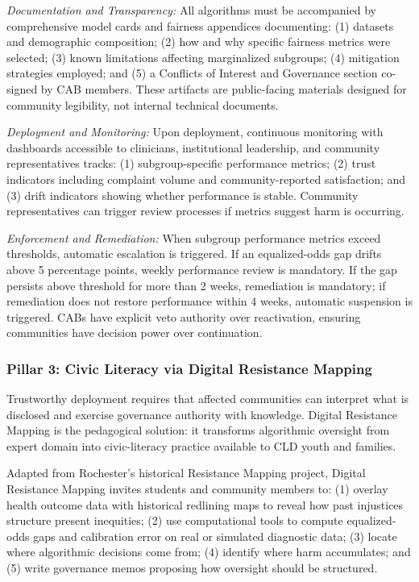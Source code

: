 \documentclass[12pt,a4paper]{article}
\begin{document}
\textit{Documentation and Transparency:} All algorithms must be accompanied by comprehensive model cards and fairness appendices documenting: (1) datasets and demographic composition; (2) how and why specific fairness metrics were selected; (3) known limitations affecting marginalized subgroups; (4) mitigation strategies employed; and (5) a Conflicts of Interest and Governance section co-signed by CAB members.\cite{chen2023} These artifacts are public-facing materials designed for community legibility, not internal technical documents.\cite{lekadir2025}

\textit{Deployment and Monitoring:} Upon deployment, continuous monitoring with dashboards accessible to clinicians, institutional leadership, and community representatives tracks: (1) subgroup-specific performance metrics; (2) trust indicators including complaint volume and community-reported satisfaction; and (3) drift indicators showing whether performance is stable.\cite{sagona2025} Community representatives can trigger review processes if metrics suggest harm is occurring.

\textit{Enforcement and Remediation:} When subgroup performance metrics exceed thresholds, automatic escalation is triggered. If an equalized-odds gap drifts above 5 percentage points, weekly performance review is mandatory. If the gap persists above threshold for more than 2 weeks, remediation is mandatory; if remediation does not restore performance within 4 weeks, automatic suspension is triggered.\cite{chen2023} CABs have explicit veto authority over reactivation, ensuring communities have decision power over continuation.

\subsubsection{Pillar 3: Civic Literacy via Digital Resistance Mapping}

Trustworthy deployment requires that affected communities can interpret what is disclosed and exercise governance authority with knowledge.\cite{munn_idai700} Digital Resistance Mapping is the pedagogical solution: it transforms algorithmic oversight from expert domain into civic-literacy practice available to CLD youth and families.\cite{garcia_ed415}

Adapted from Rochester's historical Resistance Mapping project, Digital Resistance Mapping invites students and community members to: (1) overlay health outcome data with historical redlining maps to reveal how past injustices structure present inequities; (2) use computational tools to compute equalized-odds gaps and calibration error on real or simulated diagnostic data; (3) locate where algorithmic decisions come from; (4) identify where harm accumulates; and (5) write governance memos proposing how oversight should be structured.\cite{garcia_ed415}
\end{document}
